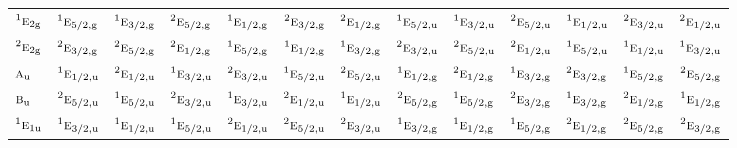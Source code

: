 \documentclass[10pt,a4paper]{article}
\numberwithin{equation}{section}
\newcommand{\irr}[1]{\text{\normalfont\scshape #1}}
\newcommand{\conjpair}[1]{{}^{#1}}
\newcommand{\ptag}[1]{\mathrm{#1}}
\begin{document}
{\begin{longtable}{@{}lcccccccccccc@{}}
$\conjpair{1}\irr{e}_{2\ptag{g}}$ & $\conjpair{1}\irr{e}_{5/2,\ptag{g}}$ & $\conjpair{1}\irr{e}_{3/2,\ptag{g}}$ & $\conjpair{2}\irr{e}_{5/2,\ptag{g}}$ & $\conjpair{1}\irr{e}_{1/2,\ptag{g}}$ & $\conjpair{2}\irr{e}_{3/2,\ptag{g}}$ & $\conjpair{2}\irr{e}_{1/2,\ptag{g}}$ & $\conjpair{1}\irr{e}_{5/2,\ptag{u}}$ & $\conjpair{1}\irr{e}_{3/2,\ptag{u}}$ & $\conjpair{2}\irr{e}_{5/2,\ptag{u}}$ & $\conjpair{1}\irr{e}_{1/2,\ptag{u}}$ & $\conjpair{2}\irr{e}_{3/2,\ptag{u}}$ & $\conjpair{2}\irr{e}_{1/2,\ptag{u}}$\\
$\conjpair{2}\irr{e}_{2\ptag{g}}$ & $\conjpair{2}\irr{e}_{3/2,\ptag{g}}$ & $\conjpair{2}\irr{e}_{5/2,\ptag{g}}$ & $\conjpair{2}\irr{e}_{1/2,\ptag{g}}$ & $\conjpair{1}\irr{e}_{5/2,\ptag{g}}$ & $\conjpair{1}\irr{e}_{1/2,\ptag{g}}$ & $\conjpair{1}\irr{e}_{3/2,\ptag{g}}$ & $\conjpair{2}\irr{e}_{3/2,\ptag{u}}$ & $\conjpair{2}\irr{e}_{5/2,\ptag{u}}$ & $\conjpair{2}\irr{e}_{1/2,\ptag{u}}$ & $\conjpair{1}\irr{e}_{5/2,\ptag{u}}$ & $\conjpair{1}\irr{e}_{1/2,\ptag{u}}$ & $\conjpair{1}\irr{e}_{3/2,\ptag{u}}$\\
$\irr{a}_{\ptag{u}}$ & $\conjpair{1}\irr{e}_{1/2,\ptag{u}}$ & $\conjpair{2}\irr{e}_{1/2,\ptag{u}}$ & $\conjpair{1}\irr{e}_{3/2,\ptag{u}}$ & $\conjpair{2}\irr{e}_{3/2,\ptag{u}}$ & $\conjpair{1}\irr{e}_{5/2,\ptag{u}}$ & $\conjpair{2}\irr{e}_{5/2,\ptag{u}}$ & $\conjpair{1}\irr{e}_{1/2,\ptag{g}}$ & $\conjpair{2}\irr{e}_{1/2,\ptag{g}}$ & $\conjpair{1}\irr{e}_{3/2,\ptag{g}}$ & $\conjpair{2}\irr{e}_{3/2,\ptag{g}}$ & $\conjpair{1}\irr{e}_{5/2,\ptag{g}}$ & $\conjpair{2}\irr{e}_{5/2,\ptag{g}}$\\
$\irr{b}_{\ptag{u}}$ & $\conjpair{2}\irr{e}_{5/2,\ptag{u}}$ & $\conjpair{1}\irr{e}_{5/2,\ptag{u}}$ & $\conjpair{2}\irr{e}_{3/2,\ptag{u}}$ & $\conjpair{1}\irr{e}_{3/2,\ptag{u}}$ & $\conjpair{2}\irr{e}_{1/2,\ptag{u}}$ & $\conjpair{1}\irr{e}_{1/2,\ptag{u}}$ & $\conjpair{2}\irr{e}_{5/2,\ptag{g}}$ & $\conjpair{1}\irr{e}_{5/2,\ptag{g}}$ & $\conjpair{2}\irr{e}_{3/2,\ptag{g}}$ & $\conjpair{1}\irr{e}_{3/2,\ptag{g}}$ & $\conjpair{2}\irr{e}_{1/2,\ptag{g}}$ & $\conjpair{1}\irr{e}_{1/2,\ptag{g}}$\\
$\conjpair{1}\irr{e}_{1\ptag{u}}$ & $\conjpair{1}\irr{e}_{3/2,\ptag{u}}$ & $\conjpair{1}\irr{e}_{1/2,\ptag{u}}$ & $\conjpair{1}\irr{e}_{5/2,\ptag{u}}$ & $\conjpair{2}\irr{e}_{1/2,\ptag{u}}$ & $\conjpair{2}\irr{e}_{5/2,\ptag{u}}$ & $\conjpair{2}\irr{e}_{3/2,\ptag{u}}$ & $\conjpair{1}\irr{e}_{3/2,\ptag{g}}$ & $\conjpair{1}\irr{e}_{1/2,\ptag{g}}$ & $\conjpair{1}\irr{e}_{5/2,\ptag{g}}$ & $\conjpair{2}\irr{e}_{1/2,\ptag{g}}$ & $\conjpair{2}\irr{e}_{5/2,\ptag{g}}$ & $\conjpair{2}\irr{e}_{3/2,\ptag{g}}$\\

\end{longtable}}
\end{document}
